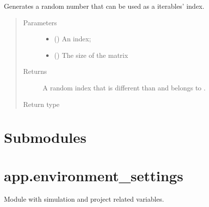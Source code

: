\documentclass[letterpaper,10pt,english]{sphinxmanual}
\begin{document}
\begin{fulllineitems}
\label{\detokenize{app.utils:app.utils.randoms.random_index}}
Generates a random number that can be used as a iterables’ index.
\begin{quote}\begin{description}
\item[{Parameters}] \leavevmode\begin{itemize}
\item {} 
 () \textendash{} An index;

\item {} 
 () \textendash{} The size of the matrix

\end{itemize}

\item[{Returns}] \leavevmode
A random index that is different than  and belongs to \sphinxcode{\sphinxupquote{{[}0, size)}}.

\item[{Return type}] \leavevmode
{}

\end{description}\end{quote}

\end{fulllineitems}



\section{Submodules}
\label{\detokenize{app:submodules}}

\section{app.environment\_settings}
\label{\detokenize{app:module-app.environment_settings}}\label{\detokenize{app:app-environment-settings}}
Module with simulation and project related variables.
\end{document}
